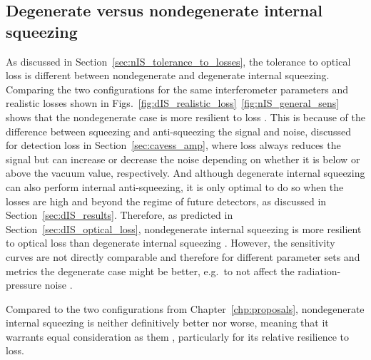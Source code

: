 \subsection{Degenerate versus nondegenerate internal squeezing}

As discussed in Section~\ref{sec:nIS_tolerance_to_losses}, the tolerance to optical loss is different between nondegenerate and degenerate internal squeezing. Comparing the two configurations for the same interferometer parameters and realistic losses shown in Figs.~\ref{fig:dIS_realistic_loss}~\ref{fig:nIS_general_sens}  shows that the nondegenerate case is more resilient to loss . 
This is because of the difference between squeezing and anti-squeezing the signal and noise, discussed for detection loss in Section~\ref{sec:cavess_amp}, where loss always reduces the signal but can increase or decrease the noise depending on whether it is below or above the vacuum value, respectively. And although degenerate internal squeezing can also perform internal anti-squeezing, it is only optimal to do so when the losses are high and beyond the regime of future detectors, as discussed in Section~\ref{sec:dIS_results}. 
Therefore, as predicted in Section~\ref{sec:dIS_optical_loss}, nondegenerate internal squeezing is more resilient to optical loss than degenerate internal squeezing . However, the sensitivity curves are not directly comparable and therefore for different parameter sets and metrics the degenerate case might be better, e.g.\ to not affect the radiation-pressure noise . %


Compared to the two configurations from Chapter~\ref{chp:proposals}, nondegenerate internal squeezing is neither definitively better nor worse, meaning that it warrants equal consideration as them , particularly for its relative resilience to loss. %




